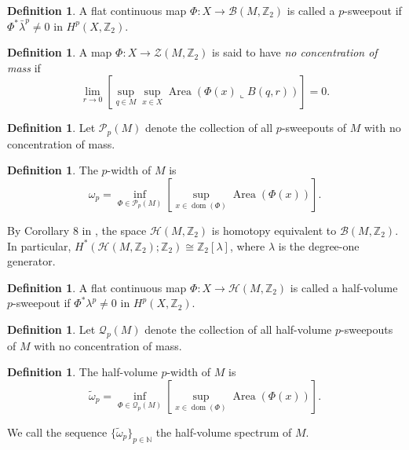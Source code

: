 \documentclass[12pt,english]{article}
\theoremstyle{definition}
\newtheorem{definition}[theorem]{Definition}
\begin{document}
\begin{definition}
\label{ps}
A flat continuous map $\Phi: X\to \mathcal B(M,\mathbb{Z}_2)$ is called a $p$-sweepout if $\Phi^*\bar\lambda^p \neq 0$ in $H^p(X,\mathbb{Z}_2)$.
\end{definition}

\begin{definition}
A map $\Phi: X\to \mathcal Z(M,\mathbb{Z}_2)$ is said to have {\it no concentration of mass} if
\[
\lim_{r\to 0} \left[\sup_{q\in M} \sup_{x\in X} \operatorname{Area}(\Phi(x) \llcorner B(q,r))\right] = 0.
\]
\end{definition}

\begin{definition}
Let $\mathcal P_p(M)$ denote the collection of all $p$-sweepouts of $M$ with no concentration of mass.
\end{definition}

\begin{definition}
The $p$-width of $M$ is
\[
\omega_p = \inf_{\Phi\in \mathcal P_p(M)} \left[\sup_{x\in \operatorname{dom}(\Phi)} \operatorname{Area}(\Phi(x))\right].
\]
\end{definition}

By Corollary 8 in \cite{ZhouMazur0}, the space \(\mathcal H(M,\mathbb{Z}_2)\) is homotopy equivalent to \(\mathcal B(M,\mathbb{Z}_2)\). In particular, \(H^*(\mathcal H(M,\mathbb{Z}_2);\mathbb{Z}_2)\cong \mathbb{Z}_2[\lambda]\), where \(\lambda\) is the degree-one generator.

\begin{definition}
A flat continuous map $\Phi: X\to \mathcal H(M,\mathbb{Z}_2)$ is called a half-volume $p$-sweepout if $\Phi^* \lambda^p \neq 0$ in $H^p(X,\mathbb{Z}_2)$.
\end{definition}

\begin{definition}
Let $\mathcal Q_p(M)$ denote the collection of all half-volume $p$-sweepouts of $M$ with no concentration of mass.
\end{definition}

\begin{definition}
The half-volume $p$-width of $M$ is
\[
\tilde \omega_p = \inf_{\Phi\in \mathcal Q_p(M)}\left[\sup_{x\in \operatorname{dom}(\Phi)} \operatorname{Area}(\Phi(x))\right].
\]
\end{definition}

We call the sequence $\{\tilde \omega_p\}_{p\in \mathbb{N}}$ the half-volume spectrum of $M$.
\end{document}
